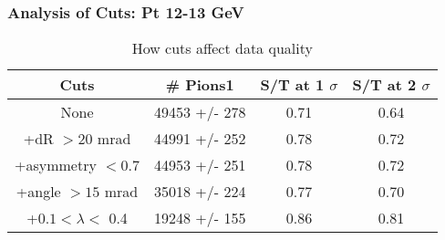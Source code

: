 \frame
{
\frametitle{Analysis of Cuts: Pt 12-13 GeV}
\begin{table}
\caption{How cuts affect data quality}
\centering
\begin{tabular}{c c c c}
\hline\hline
Cuts & \# Pions1 & S/T at 1 $\sigma$ & S/T at 2 $\sigma$ \\ [0.5ex]
\hline
None & 49453 +/-  278 & 0.71 & 0.64 \\ %
+dR $> 20$ mrad & 44991 +/-  252 & 0.78 & 0.72 \\ %
+asymmetry $< 0.7$ & 44953 +/-  251 & 0.78 & 0.72 \\ %
+angle $> 15$ mrad & 35018 +/-  224 & 0.77 & 0.70 \\ %
+$0.1 < \lambda <$ 0.4 & 19248 +/-  155 & 0.86 & 0.81 \\ %
[1ex]
\hline
\end{tabular}
\label{table:nonlin}
\end{table}
}
